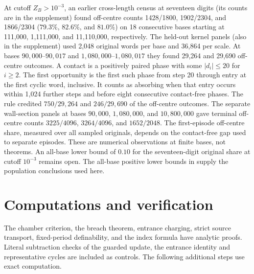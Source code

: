 \documentclass[11pt,reqno]{amsart}
\theoremstyle{definition}
\begin{document}
At cutoff \(Z_B>10^{-3}\), an earlier cross-length census at seventeen digits (its counts are in the supplement) found off-centre counts 1428/1800, 1902/2304, and 1866/2304 (\(79.3\%\), \(82.6\%\), and \(81.0\%\)) on 18 consecutive bases starting at 111,000, 1,111,000, and 11,110,000, respectively. The held-out kernel panels (also in the supplement) used 2,048 original words per base and 36,864 per scale. At bases \(90,000\)--\(90,017\) and \(1,080,000\)--\(1,080,017\) they found 29,264 and 29,690 off-centre outcomes. A contact is a positively paired phase with some \(|d_i|\le20\) for \(i\ge2\). The first opportunity is the first such phase from step 20 through entry at the first cyclic word, inclusive. It counts as absorbing when that entry occurs within 1,024 further steps and before eight consecutive contact-free phases. The rule credited \(750/29,264\) and \(246/29,690\) of the off-centre outcomes. The separate wall-section panels at bases \(90,000\), \(1,080,000\), and \(10,800,000\) gave terminal off-centre counts \(3225/4096\), \(3264/4096\), and \(1652/2048\). The first-episode off-centre share, measured over all sampled originals, depends on the contact-free gap used to separate episodes. These are numerical observations at finite bases, not theorems. An all-base lower bound of \(0.10\) for the seventeen-digit original share at cutoff \(10^{-3}\) remains open. The all-base positive lower bounds in \cite{G9} supply the population conclusions used here.

\section{Computations and verification}\label{sec:verify}
The chamber criterion, the breach theorem, entrance charging, strict source transport, fixed-period definability, and the index formula have analytic proofs. Literal subtraction checks of the guarded update, the entrance identity and representative cycles are included as controls. The following additional steps use exact computation.
\end{document}
